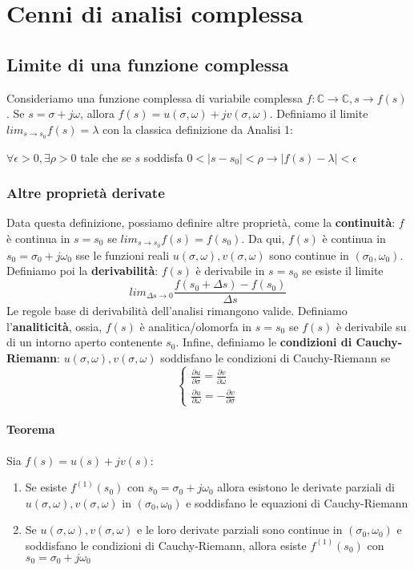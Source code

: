 \documentclass[11pt]{article}
\begin{document}
\section{Cenni di analisi complessa}
\subsection{Limite di una funzione complessa}
Consideriamo una funzione complessa di variabile complessa $f: \mathbb{C} \rightarrow \mathbb{C}, s \rightarrow f(s)$. Se $s = \sigma + j \omega$, allora $f(s) = u(\sigma, \omega)+ jv(\sigma, \omega)$. Definiamo il limite $lim_{s\rightarrow s_0} f(s) = \lambda$ con la classica definizione da Analisi 1:
\begin{center}
    $\forall \epsilon >0, \exists \rho >0$ tale che se $s$ soddisfa $0<|s-s_0|<\rho \rightarrow |f(s) - \lambda| < \epsilon$
\end{center}
\subsubsection{Altre proprietà derivate}
Data questa definizione, possiamo definire altre proprietà, come la \textbf{continuità}: $f$ è continua in $s=s_0$ se $lim_{s\rightarrow s_0} f(s) = f(s_0)$. Da qui, $f(s)$ è continua in $s_0 = \sigma_0 + j\omega_0$ sse le funzioni reali $u(\sigma, \omega), v(\sigma, \omega)$ sono continue in $(\sigma_0, \omega_0)$. Definiamo poi la \textbf{derivabilità}: $f(s)$ è derivabile in $s=s_0$ se esiste il limite
\begin{displaymath}
    lim_{\Delta s\rightarrow 0} \frac{f(s_0 + \Delta s) - f(s_0)}{\Delta s}
\end{displaymath}
Le regole base di derivabilità dell'analisi rimangono valide. Definiamo l'\textbf{analiticità}, ossia, $f(s)$ è analitica/olomorfa in $s=s_0$ se $f(s)$ è derivabile su di un intorno aperto contenente $s_0$.
Infine, definiamo le \textbf{condizioni di Cauchy-Riemann}: $u(\sigma, \omega), v(\sigma, \omega)$ soddisfano le condizioni di Cauchy-Riemann se
\begin{displaymath}
    \begin{cases}
        \frac{\partial u}{\partial \sigma} = \frac{\partial v}{\partial \omega} \\ \frac{\partial u}{\partial \omega} = - \frac{\partial v}{\partial \sigma}
    \end{cases}
\end{displaymath}
\paragraph{Teorema}
Sia $f(s) = u(s) + jv(s)$:
\begin{enumerate}
    \item Se esiste $f^{(1)} (s_0)$ con $s_0 = \sigma_0 + j\omega_0$ allora esistono le derivate parziali di $u(\sigma, \omega), v(\sigma, \omega)$ in $(\sigma_0, \omega_0)$ e soddisfano le equazioni di Cauchy-Riemann
    \item Se $u(\sigma, \omega), v(\sigma, \omega)$ e le loro derivate parziali sono continue in $(\sigma_0, \omega_0)$ e soddisfano le condizioni di Cauchy-Riemann, allora esiste $f^{(1)} (s_0)$ con $s_0 = \sigma_0 + j\omega_0$
\end{enumerate}
\end{document}
